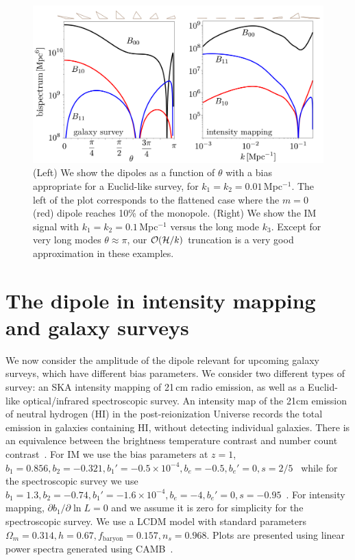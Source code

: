 \begin{figure}[!ht]
\begin{center}
\includegraphics[width=\columnwidth]{fig/figuresv2-01}
\caption{ (Left) We show the dipoles as a function of $\theta$ with a bias appropriate for a Euclid-like survey, for $k_1=k_2=0.01$\,Mpc$^{-1}$. The left of the plot corresponds to the flattened case where the $m=0$ (red) dipole reaches 10\% of the monopole.  (Right) We show the IM signal with $k_1=k_2=0.1$\,Mpc$^{-1}$ versus the long mode $k_3$. Except for very long modes $\theta\approx\pi$, our $\mathcal{O}(\mathcal{H}/k)$ truncation is a very good approximation in these examples. }
\label{sankcjnakjdcs}
\end{center}
\end{figure}
 
\section{The dipole in intensity mapping and galaxy surveys}

We now consider the amplitude of the dipole relevant for upcoming galaxy surveys, which have different bias parameters. We consider two different types of survey: an SKA intensity mapping of 21\,cm radio emission, as well as a Euclid-like optical/infrared spectroscopic survey.
An intensity map of the 21cm emission of neutral hydrogen (HI) in the post-reionization Universe records the total emission in galaxies containing HI, without detecting individual galaxies. There is an equivalence between the brightness temperature contrast and number count contrast~\cite{Umeh:2015gza}. For IM we use the bias parameters at $z=1$, 
$b_1 = 0.856, b_2 = -0.321, b_1' = -0.5\times10^{-4}, b_e = -0.5, b_e'=0, s = 2/5$~\cite{Fonseca:2018hsu,Umeh:2015gza}
while for the spectroscopic survey we use 
$ b_1 = 1.3,b_2 = -0.74, b_1' = -1.6\times10^{-4},  b_e = -4, b_e' = 0, s = -0.95$~\cite{Camera:2018jys,Yankelevich:2018uaz}.
For intensity mapping, $ \partial b_1/\partial \ln L =0$ and we assume it is zero for simplicity for the spectroscopic survey. We use a LCDM model with standard parameters $\Omega_m=0.314, h=0.67, f_\text{baryon}=0.157, n_s=0.968$. Plots are presented using linear power spectra generated using CAMB~\cite{Lewis:1999bs}.

